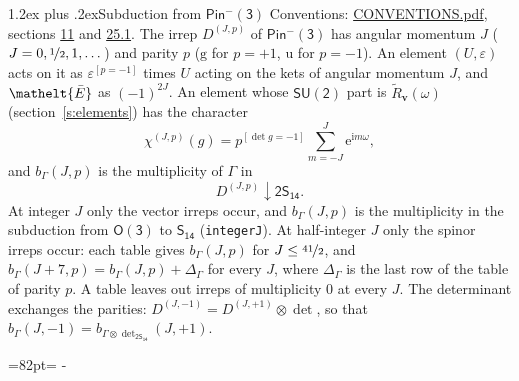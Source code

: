\documentclass[10pt,a4paper]{article}
\makeatletter
\renewcommand\section{\@startsection{section}{1}{\z@}{-3ex plus -1ex minus -.2ex}%
  {1.2ex plus .2ex}{\normalfont\large\sffamily\bfseries\color{parttitle}}}
\newcommand{\needspace}[1]{\par\penalty-100\begingroup\dimen0=#1\relax\dimen2=\pagegoal
  \advance\dimen2-\pagetotal\ifdim\dimen0>\dimen2\relax\ifdim\dimen2>0pt\vfil\break\fi\fi
  \endgroup}
\numberwithin{equation}{section}
\newcommand{\eltfont}[1]{{\let\sigma\eltsigma\mathelt{#1}}}
\newcommand{\grp}[1]{\mathsf{#1}}
\newcommand{\elt}[1]{\eltfont{#1}}
\newcommand{\ptag}[1]{\mathrm{#1}}
\newcommand{\iverson}[1]{[#1]}
\newcommand{\restr}[2]{#1\!\downarrow#2}
\newcommand{\vv}{\mathbf{v}}
\newcommand{\iunit}{\mathrm{i}}
\newcommand{\expe}{\mathrm{e}}
\newcommand{\irrJp}[2]{D^{(#1,#2)}}
\newcommand{\irrprod}{\otimes}
\newcommand{\barred}[1]{\bar{#1}}
\newcommand{\lift}[1]{\tilde{#1}}
\makeatother
\begin{document}
\section{Subduction from \texorpdfstring{$\grp{Pin^{-}(3)}$}{Pin(3)}}\label{s:subduction_parent}
Conventions: \href{../../CONVENTIONS.pdf}{CONVENTIONS.pdf}, sections \href{../../../rotation/CONVENTIONS.pdf\#conv.11}{11} and \href{../../CONVENTIONS.pdf\#conv.25.1}{25.1}.
\leavevmode\label{n:index.J}\label{n:index.parity}\label{n:irrep.o3}The irrep $\irrJp{J}{p}$ of \href{Pinminus3.pdf}{$\grp{Pin^{-}(3)}$} has angular momentum $J$ ($J = 0, \nicefrac{1}{2}, 1, \dots$) and parity $p$ ($\ptag{g}$ for $p = +1$, $\ptag{u}$ for $p = -1$). An element $(U, \varepsilon)$ acts on it as $\varepsilon^{[p = -1]}$ times $U$ acting on the kets of angular momentum $J$, and $\elt{\barred{E}}$ as $(-1)^{2J}$. \label{n:function.character.parent}\label{n:function.multiplicity}An element whose $\grp{SU(2)}$ part is $\lift{R}_{\vv}(\omega)$ (section~\ref{s:elements}) has the character
\begin{equation}\label{e:chi}\chi^{(J,p)}(g) = p^{\iverson{\det g = -1}}\sum_{m=-J}^{J} \expe^{\iunit m\omega},\end{equation}
and $b_\Gamma(J, p)$ is the multiplicity of $\Gamma$ in
\begin{equation}\label{e:parent}\restr{\irrJp{J}{p}}{\grp{2S_{14}}}.\end{equation}
At integer $J$ only the vector irreps occur, and $b_\Gamma(J, p)$ is the multiplicity in the subduction from $\grp{O(3)}$ to \href{../../../rotation/data/pdf/S14.pdf}{$\grp{S_{14}}$} (\texttt{integerJ}). \label{n:index.increment}At half-integer $J$ only the spinor irreps occur: each table gives $b_\Gamma(J, p)$ for $J \le \nicefrac{41}{2}$, and $b_\Gamma(J + 7, p) = b_\Gamma(J, p) + \Delta_\Gamma$ for every $J$, where $\Delta_\Gamma$ is the last row of the table of parity $p$. A table leaves out irreps of multiplicity 0 at every $J$.
\leavevmode\label{n:operator.determinant.character}The determinant exchanges the parities: $\irrJp{J}{-1} = \irrJp{J}{+1} \irrprod \det$, so that $b_\Gamma(J, -1) = b_{\Gamma \irrprod \det_{\grp{2S_{14}}}}(J, +1)$.
\needspace{82pt}
\end{document}
